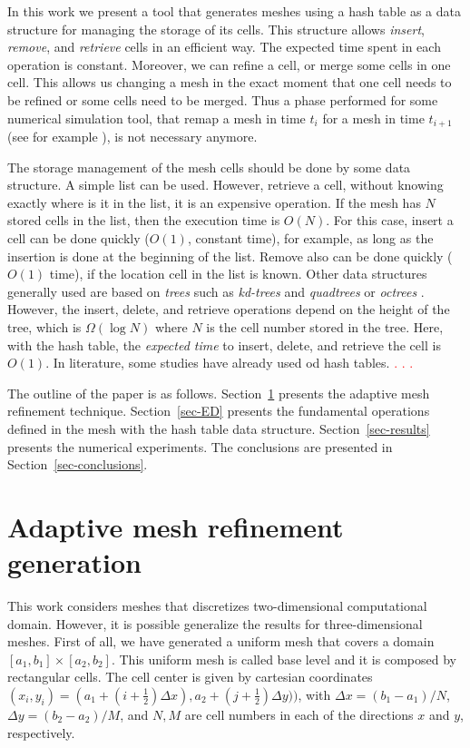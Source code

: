 \documentclass[review]{elsarticle}
\begin{document}
In this work we present a tool that generates meshes using a hash table as a data structure for managing the storage of its cells. This structure allows \emph{insert}, \emph{remove}, and \emph{retrieve} cells in an efficient way. The expected time spent in each operation is constant. Moreover, we can refine a cell, or merge some cells in one cell. This allows us changing a mesh in the exact moment that one cell needs to be refined or some cells need to be merged. Thus a phase performed for some numerical simulation tool, that remap a mesh in time $t_i$ for a mesh in time $t_{i+1}$ (see for example \cite{COL18}), is not necessary anymore.

The storage management of the mesh cells should be done by some data structure. A simple list can be used. However, retrieve a cell, without knowing exactly where is it in the list, it is an expensive operation. If the mesh has $N$ stored cells in the list, then the execution time is $O(N)$. For this case, insert a cell can be done quickly ($O(1)$, constant time), for example, as long as the insertion is done at the beginning of the list. Remove also can be done quickly ($O(1)$ time), if the location cell in the list is known. Other data structures generally used are based on \emph{trees} such as \emph{kd-trees} and \emph{quadtrees} or \emph{octrees} \textcolor{red}{\cite{}}. However, the insert, delete, and retrieve operations depend on the height of the tree, which is $\Omega(\log N)$ where $N$ is the cell number stored in the tree. Here, with the hash table, the \emph{expected time} to insert, delete, and retrieve the cell is $O(1)$. In literature, some studies have already used od hash tables. \textcolor{red}{\cite{COL18}. \cite{GRI99}. \cite{MUL03}.}

The outline of the paper is as follows. Section~\ref{sec-AMR} presents the adaptive mesh refinement technique. Section~\ref{sec-ED} presents the fundamental operations defined in the mesh with the hash table data structure. Section~\ref{sec-results} presents the numerical experiments. The conclusions are presented in Section~\ref{sec-conclusions}.
 


\section{Adaptive mesh refinement generation}\label{sec-AMR}


This work considers meshes that discretizes two-dimensional computational domain. However, it is possible generalize the results for three-dimensional meshes. First of all, we have generated a uniform mesh that covers a domain $[a_1,b_1]\times[a_2,b_2]$. This uniform mesh is called base level and it is composed by rectangular cells. The cell center is given by cartesian coordinates $(x_i,y_i) = (a_1 + (i + \frac{1}{2})\Delta x), a_2 + (j + \frac{1}{2})\Delta y))$, with $\Delta x = (b_1 - a_1)/N$, $\Delta y = (b_2 - a_2)/M$, and $N, M$ are cell numbers in each of the directions $x$ and $y$, respectively. 
\end{document}
